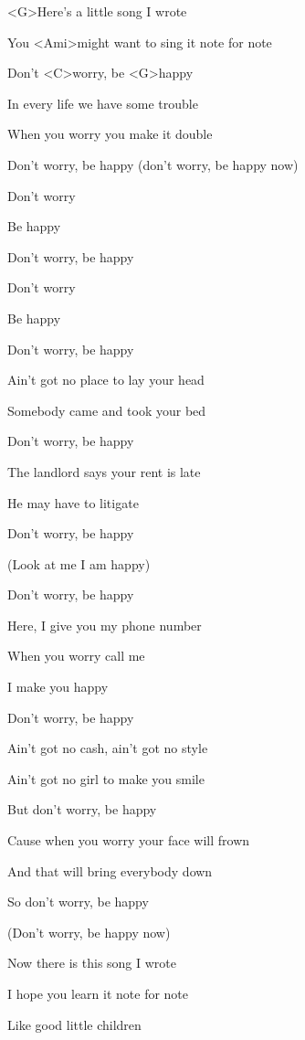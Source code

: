

\zs
<G>Here's a little song I wrote

You <Ami>might want to sing it note for note

Don't <C>worry, be <G>happy

In every life we have some trouble

When you worry you make it double

Don't worry, be happy (don't worry, be happy now)
\ks

\zr
Don't worry

Be happy

Don't worry, be happy

Don't worry

Be happy

Don't worry, be happy
\kr

\zs
Ain't got no place to lay your head

Somebody came and took your bed

Don't worry, be happy

The landlord says your rent is late

He may have to litigate

Don't worry, be happy

(Look at me I am happy)
\ks

\zr
Don't worry, be happy

Here, I give you my phone number

When you worry call me

I make you happy

Don't worry, be happy
\kr

\zs
Ain't got no cash, ain't got no style

Ain't got no girl to make you smile

But don't worry, be happy

Cause when you worry your face will frown

And that will bring everybody down

So don't worry, be happy

(Don't worry, be happy now)
\ks

\zr
\kr

\zs
Now there is this song I wrote

I hope you learn it note for note

Like good little children

